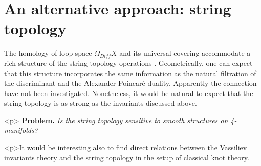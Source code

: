 \documentclass{article}
\def\<{\textless}
\def\>{\textgreater}
\begin{document}
\section{An alternative approach: string topology}\label{s9}

The homology of loop space $\Omega_{Diff}X$ and its universal covering 
accommodate a rich structure of the string topology operations \cite{CS}.
Geometrically, one can expect that this structure incorporates the same 
information as the 
natural filtration of the discriminant and the Alexander-Poincar\'e duality.
Apparently the connection have not been investigated. Nonetheless, it would
be natural to expect that the string topology is as strong as the invariants
discussed above. 

\<p\> 
{\bf Problem.\/} {\it Is the string topology sensitive to smooth structures
on 4-manifolds?} 

\<p\>It would be interesting also to find direct relations between the Vassiliev
invariants theory and the string topology in the setup of classical knot 
theory.  
\end{document}

